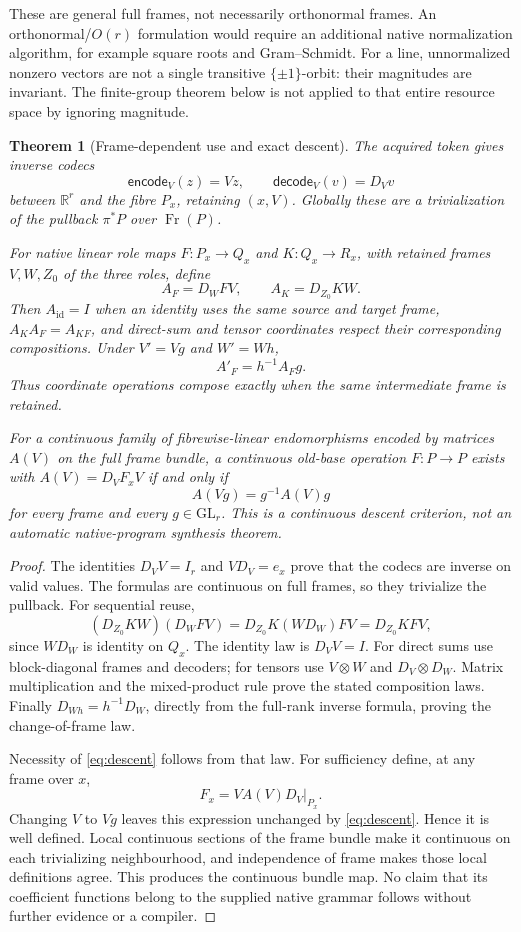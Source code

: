 \documentclass[11pt]{article}
\newtheorem{theorem}{Theorem}[section]
\theoremstyle{definition}
\theoremstyle{remark}
\newcommand{\R}{\mathbb R}
\newcommand{\id}{\operatorname{id}}
\newcommand{\Fr}{\operatorname{Fr}}
\begin{document}
These are general full frames, not necessarily orthonormal frames. An orthonormal/$O(r)$ formulation would require an additional native normalization algorithm, for example square roots and Gram--Schmidt. For a line, unnormalized nonzero vectors are not a single transitive $\{\pm1\}$-orbit: their magnitudes are invariant. The finite-group theorem below is not applied to that entire resource space by ignoring magnitude.

\begin{theorem}[Frame-dependent use and exact descent]\label{thm:frame-reuse}
The acquired token gives inverse codecs
\[
 \mathsf{encode}_V(z)=Vz,\qquad \mathsf{decode}_V(v)=D_Vv
\]
between $\R^r$ and the fibre $P_x$, retaining $(x,V)$. Globally these are a trivialization of the pullback $\pi^*P$ over $\Fr(P)$.

For native linear role maps $F:P_x\to Q_x$ and $K:Q_x\to R_x$, with retained frames $V,W,Z_0$ of the three roles, define
\[
 A_F=D_WFV,\qquad A_K=D_{Z_0}KW.
\]
Then $A_{\id}=I$ when an identity uses the same source and target frame, $A_KA_F=A_{KF}$, and direct-sum and tensor coordinates respect their corresponding compositions. Under $V'=Vg$ and $W'=Wh$,
\[
                         A'_F=h^{-1}A_Fg.
\]
Thus coordinate operations compose exactly when the same intermediate frame is retained.

For a continuous family of fibrewise-linear endomorphisms encoded by matrices $A(V)$ on the full frame bundle, a continuous old-base operation $F:P\to P$ exists with $A(V)=D_VF_xV$ if and only if
\begin{equation}\label{eq:descent}
                    A(Vg)=g^{-1}A(V)g
\end{equation}
for every frame and every $g\in\mathrm{GL}_r$. This is a continuous descent criterion, not an automatic native-program synthesis theorem.
\end{theorem}
\begin{proof}
The identities $D_VV=I_r$ and $VD_V=e_x$ prove that the codecs are inverse on valid values. The formulas are continuous on full frames, so they trivialize the pullback. For sequential reuse,
\[
 (D_{Z_0}KW)(D_WFV)
 =D_{Z_0}K(WD_W)FV=D_{Z_0}KFV,
\]
since $WD_W$ is identity on $Q_x$. The identity law is $D_VV=I$. For direct sums use block-diagonal frames and decoders; for tensors use $V\otimes W$ and $D_V\otimes D_W$. Matrix multiplication and the mixed-product rule prove the stated composition laws. Finally $D_{Wh}=h^{-1}D_W$, directly from the full-rank inverse formula, proving the change-of-frame law.

Necessity of \eqref{eq:descent} follows from that law. For sufficiency define, at any frame over $x$,
\[
                         F_x=V A(V)D_V\big|_{P_x}.
\]
Changing $V$ to $Vg$ leaves this expression unchanged by \eqref{eq:descent}. Hence it is well defined. Local continuous sections of the frame bundle make it continuous on each trivializing neighbourhood, and independence of frame makes those local definitions agree. This produces the continuous bundle map. No claim that its coefficient functions belong to the supplied native grammar follows without further evidence or a compiler.
\end{proof}
\end{document}
